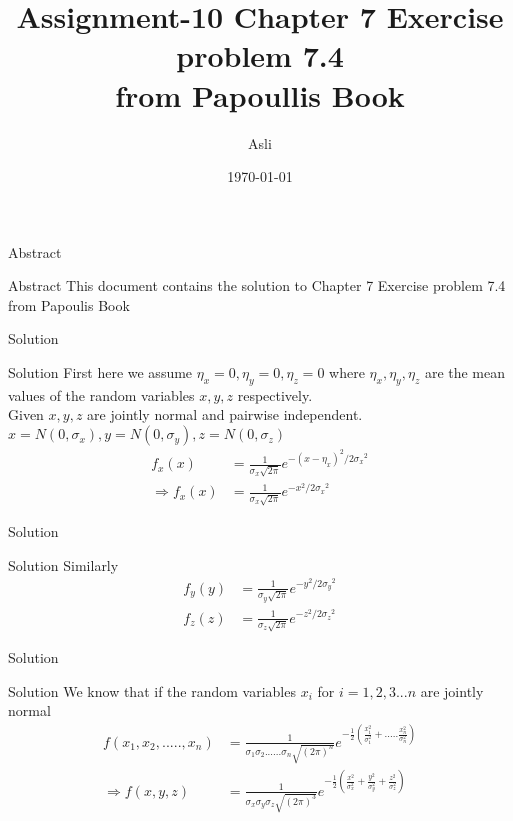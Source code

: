 \documentclass{beamer}
\title{ Assignment-10 Chapter 7 Exercise problem 7.4 \\
from Papoullis Book}
\author{Asli}
\institute{IIT Hyderabad}
\date{\today }
\providecommand{\brak}[1]{\ensuremath{\left(#1\right)}}
\begin{document}
\begin{frame}
      \titlepage
\end{frame}



\begin{frame}{Abstract}
     \begin{block}{Abstract}
          This document contains the solution to Chapter 7 Exercise problem 7.4 from Papoulis Book
      \end{block}
\end{frame}



\begin{frame}{Solution}
\begin{block}{Solution}
First here we assume $\eta_x = 0 ,\eta_y = 0 ,\eta_z = 0 $ where $\eta_x,\eta_y,\eta_z$ are the mean values of the random variables $x,y,z$ respectively.\\
Given $x,y,z$ are jointly normal and pairwise independent.\\
$x = N(0,\sigma_x) , y = N(0,\sigma_y) , z = N(0,\sigma_z)$\\
\begin{align}
f_x(x) &= \frac{1}{\sigma_x\sqrt{2\pi}} e^{-{(x-\eta_x)}^{2}/2        {\sigma_x}^{2}} \\
\Rightarrow f_x(x) &= \frac{1}{\sigma_x\sqrt{2\pi}} e^{-x^{2}/2{\sigma_x}^{2}} 
\end{align}
\end{block}
\end{frame}


\begin{frame}{Solution }
\begin{block}{Solution}
    Similarly 
\begin{align}
f_y(y) &= \frac{1}{\sigma_y\sqrt{2\pi}} e^{-y^{2}/2{\sigma_y}^{2}} \\
f_z(z) &= \frac{1}{\sigma_z\sqrt{2\pi}} e^{-z^{2}/2{\sigma_z}^{2}}
\end{align}
\end{block}
\end{frame}



\begin{frame}{Solution}
  \begin{block}{Solution}
      We know that if the random variables $x_i$ for $i = 1,2,3...n$ are jointly normal 
\begin{align}
f(x_1,x_2,.....,x_n) &= \frac{1}{\sigma_1\sigma_2......\sigma_n \sqrt{{(2\pi)}^n}} e^{{-\frac{1}{2} \brak{\frac{x_1^2}{\sigma_1^2} +..... \frac{x_n^2}{\sigma_n^2} } }} \\
\Rightarrow f(x,y,z) &= \frac{1}{\sigma_x\sigma_y\sigma_z \sqrt{{(2\pi)}^3}} e^{-\frac{1}{2} \brak{ \frac{x^2}{\sigma_x^2} + \frac{y^2}{\sigma_y^2} + \frac{z^2}{\sigma_z^2} } } \\ 
\end{align}
  \end{block}

\end{frame}
\end{document}
